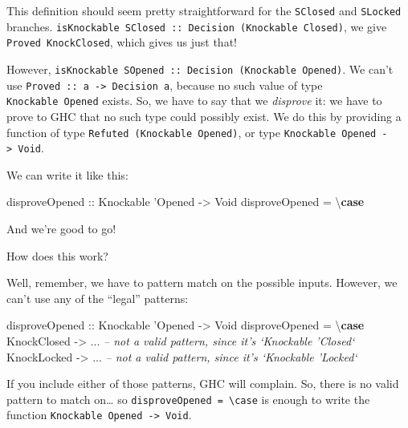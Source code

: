 \documentclass[]{article}
\newenvironment{Shaded}{}{}
\newcommand{\CommentTok}[1]{\textcolor[rgb]{0.38,0.63,0.69}{\textit{#1}}}
\newcommand{\DataTypeTok}[1]{\textcolor[rgb]{0.56,0.13,0.00}{#1}}
\newcommand{\FunctionTok}[1]{\textcolor[rgb]{0.02,0.16,0.49}{#1}}
\newcommand{\KeywordTok}[1]{\textcolor[rgb]{0.00,0.44,0.13}{\textbf{#1}}}
\newcommand{\NormalTok}[1]{#1}
\newcommand{\OtherTok}[1]{\textcolor[rgb]{0.00,0.44,0.13}{#1}}
\begin{document}
This definition should seem pretty straightforward for the \texttt{SClosed} and
\texttt{SLocked} branches.
\texttt{isKnockable\ SClosed\ ::\ Decision\ (Knockable\ \textquotesingle{}Closed)},
we give \texttt{Proved\ KnockClosed}, which gives us just that!

However,
\texttt{isKnockable\ SOpened\ ::\ Decision\ (Knockable\ \textquotesingle{}Opened)}.
We can't use \texttt{Proved\ ::\ a\ -\textgreater{}\ Decision\ a}, because no
such value of type \texttt{Knockable\ \textquotesingle{}Opened} exists. So, we
have to say that we \emph{disprove} it: we have to prove to GHC that no such
type could possibly exist. We do this by providing a function of type
\texttt{Refuted\ (Knockable\ \textquotesingle{}Opened)}, or type
\texttt{Knockable\ \textquotesingle{}Opened\ -\textgreater{}\ Void}.

We can write it like this:

\begin{Shaded}
\begin{Highlighting}[]
\OtherTok{disproveOpened ::} \DataTypeTok{Knockable}\NormalTok{ '}\DataTypeTok{Opened} \OtherTok{->} \DataTypeTok{Void}
\NormalTok{disproveOpened }\FunctionTok{=}\NormalTok{ \textbackslash{}}\KeywordTok{case}
\end{Highlighting}
\end{Shaded}

And we're good to go!

How does this work?

Well, remember, we have to pattern match on the possible inputs. However, we
can't use any of the ``legal'' patterns:

\begin{Shaded}
\begin{Highlighting}[]
\OtherTok{disproveOpened ::} \DataTypeTok{Knockable}\NormalTok{ '}\DataTypeTok{Opened} \OtherTok{->} \DataTypeTok{Void}
\NormalTok{disproveOpened }\FunctionTok{=}\NormalTok{ \textbackslash{}}\KeywordTok{case}
    \DataTypeTok{KnockClosed} \OtherTok{->} \FunctionTok{...}    \CommentTok{-- not a valid pattern, since it's `Knockable 'Closed`}
    \DataTypeTok{KnockLocked} \OtherTok{->} \FunctionTok{...}    \CommentTok{-- not a valid pattern, since it's `Knockable 'Locked`}
\end{Highlighting}
\end{Shaded}

If you include either of those patterns, GHC will complain. So, there is no
valid pattern to match on\ldots{} so
\texttt{disproveOpened\ =\ \textbackslash{}case} is enough to write the function
\texttt{Knockable\ \textquotesingle{}Opened\ -\textgreater{}\ Void}.
\end{document}
